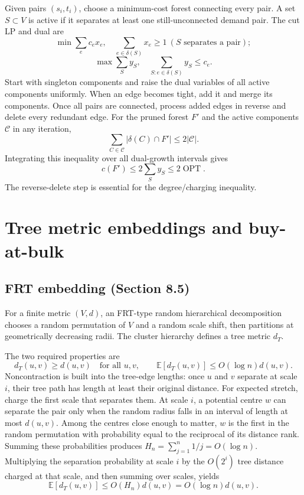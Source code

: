 \documentclass[11pt,a4paper]{article}
\newcommand{\OPT}{\operatorname{OPT}}
\newcommand{\E}{\mathbb E}
\newcommand{\1}{\mathbf 1}
\begin{document}
Given pairs $(s_i,t_i)$, choose a minimum-cost forest connecting every pair.  A set
$S\subset V$ is active if it separates at least one still-unconnected demand pair.
The cut LP and dual are
\[
 \min\sum_ec_ex_e,\quad
 \sum_{e\in\delta(S)}x_e\geq1\ (S\text{ separates a pair});
\]
\[
 \max\sum_Sy_S,\quad
 \sum_{S:e\in\delta(S)}y_S\leq c_e.
\]
Start with singleton components and raise the dual variables of all active components
uniformly.  When an edge becomes tight, add it and merge its components.  Once all
pairs are connected, process added edges in reverse and delete every redundant edge.
For the pruned forest $F'$ and the active components $\mathcal C$ in any iteration,
\[
  \sum_{C\in\mathcal C}|\delta(C)\cap F'|\leq2|\mathcal C|.
\]
Integrating this inequality over all dual-growth intervals gives
\[
 c(F')\leq2\sum_Sy_S\leq2\OPT.
\]
The reverse-delete step is essential for the degree/charging inequality.

\section{Tree metric embeddings and buy-at-bulk}

\subsection{FRT embedding (Section 8.5)}

For a finite metric $(V,d)$, an FRT-type random hierarchical decomposition chooses a
random permutation of $V$ and a random scale shift, then partitions at geometrically
decreasing radii.  The cluster hierarchy defines a tree metric $d_T$.

The two required properties are
\[
 d_T(u,v)\geq d(u,v)\quad\text{for all }u,v,
 \qquad
 \E[d_T(u,v)]\leq O(\log n)d(u,v).
\]
Noncontraction is built into the tree-edge lengths: once $u$ and $v$ separate at scale
$i$, their tree path has length at least their original distance.  For expected stretch,
charge the first scale that separates them.  At scale $i$, a potential centre $w$ can
separate the pair only when the random radius falls in an interval of length at most
$d(u,v)$.  Among the centres close enough to matter, $w$ is the first in the random
permutation with probability equal to the reciprocal of its distance rank.  Summing
these probabilities produces $H_n=\sum_{j=1}^n1/j=O(\log n)$.  Multiplying the
separation probability at scale $i$ by the $O(2^i)$ tree distance charged at that scale,
and then summing over scales, yields
\[
  \E[d_T(u,v)]\leq O(H_n)d(u,v)=O(\log n)d(u,v).
\]
\end{document}
